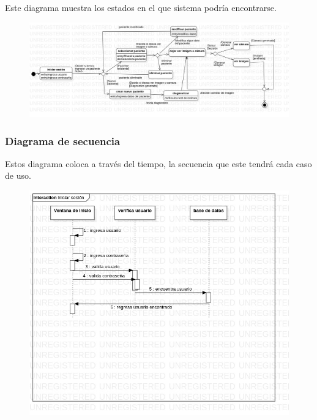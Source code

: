 \documentclass[10pt]{article}
\begin{document}
Este diagrama muestra los estados en el que sistema podría encontrarse.

\begin{figure}[H]
	\begin{center}
\includegraphics[scale = 0.35]{UML/StateMachine1!StatechartDiagram1_3.jpg}
	\end{center} 
\end{figure}
\newpage
\subsubsection{Diagrama de secuencia}

Estos diagrama coloca a través del tiempo, la secuencia que este tendrá cada caso de uso.

\begin{figure}[H]
	\begin{center}
\includegraphics[scale = 0.60]{UML/Iniciar_sesion.jpg}
	\end{center} 
\end{figure}
\end{document}
